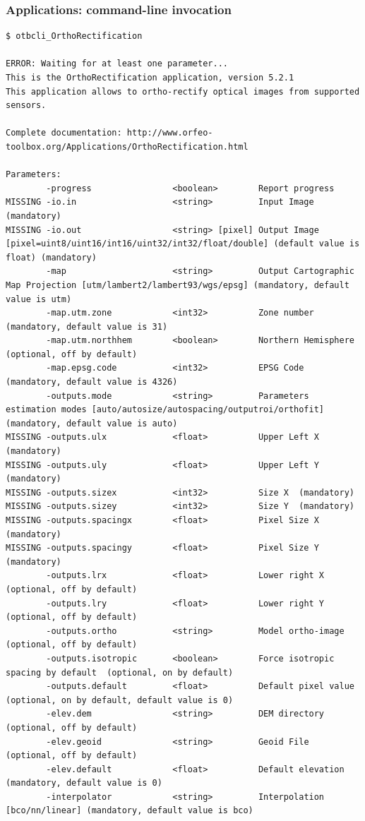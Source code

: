 \documentclass[8pt]{beamer}
\begin{document}
\begin{frame}[fragile]
\frametitle{Applications: command-line invocation}
\begin{scriptsize}
\vspace{-0.5cm}\begin{verbatim}
$ otbcli_OrthoRectification

ERROR: Waiting for at least one parameter...
This is the OrthoRectification application, version 5.2.1
This application allows to ortho-rectify optical images from supported sensors.

Complete documentation: http://www.orfeo-toolbox.org/Applications/OrthoRectification.html

Parameters:
        -progress                <boolean>        Report progress
MISSING -io.in                   <string>         Input Image  (mandatory)
MISSING -io.out                  <string> [pixel] Output Image  [pixel=uint8/uint16/int16/uint32/int32/float/double] (default value is float) (mandatory)
        -map                     <string>         Output Cartographic Map Projection [utm/lambert2/lambert93/wgs/epsg] (mandatory, default value is utm)
        -map.utm.zone            <int32>          Zone number  (mandatory, default value is 31)
        -map.utm.northhem        <boolean>        Northern Hemisphere  (optional, off by default)
        -map.epsg.code           <int32>          EPSG Code  (mandatory, default value is 4326)
        -outputs.mode            <string>         Parameters estimation modes [auto/autosize/autospacing/outputroi/orthofit] (mandatory, default value is auto)
MISSING -outputs.ulx             <float>          Upper Left X  (mandatory)
MISSING -outputs.uly             <float>          Upper Left Y  (mandatory)
MISSING -outputs.sizex           <int32>          Size X  (mandatory)
MISSING -outputs.sizey           <int32>          Size Y  (mandatory)
MISSING -outputs.spacingx        <float>          Pixel Size X  (mandatory)
MISSING -outputs.spacingy        <float>          Pixel Size Y  (mandatory)
        -outputs.lrx             <float>          Lower right X  (optional, off by default)
        -outputs.lry             <float>          Lower right Y  (optional, off by default)
        -outputs.ortho           <string>         Model ortho-image  (optional, off by default)
        -outputs.isotropic       <boolean>        Force isotropic spacing by default  (optional, on by default)
        -outputs.default         <float>          Default pixel value  (optional, on by default, default value is 0)
        -elev.dem                <string>         DEM directory  (optional, off by default)
        -elev.geoid              <string>         Geoid File  (optional, off by default)
        -elev.default            <float>          Default elevation  (mandatory, default value is 0)
        -interpolator            <string>         Interpolation [bco/nn/linear] (mandatory, default value is bco)
\end{verbatim}
\end{scriptsize}
\end{frame}
\end{document}
